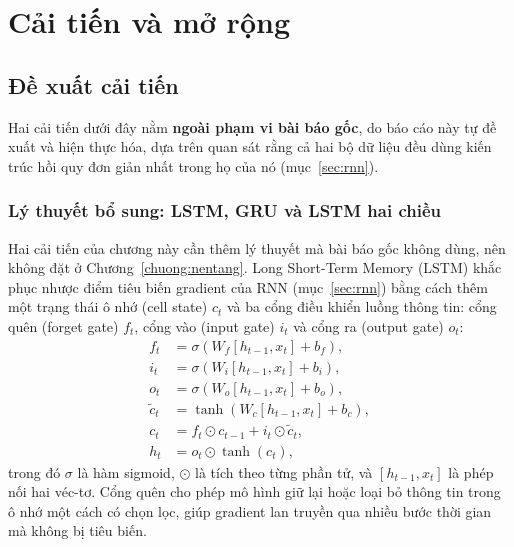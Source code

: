 \chapter{Cải tiến và mở rộng}
\label{chuong:caitien}

\section{Đề xuất cải tiến}

Hai cải tiến dưới đây nằm \textbf{ngoài phạm vi bài báo gốc}, do báo cáo này tự đề xuất và
hiện thực hóa, dựa trên quan sát rằng cả hai bộ dữ liệu đều dùng kiến trúc hồi quy đơn giản
nhất trong họ của nó (mục~\ref{sec:rnn}).

\subsection{Lý thuyết bổ sung: LSTM, GRU và LSTM hai chiều}
\label{sec:lythuyet-caitien}

Hai cải tiến của chương này cần thêm lý thuyết mà bài báo gốc không dùng, nên không đặt ở
Chương~\ref{chuong:nentang}. Long Short-Term Memory (LSTM) \cite{hochreiter1997lstm} khắc phục
nhược điểm tiêu biến gradient của RNN (mục~\ref{sec:rnn}) bằng cách thêm một trạng thái ô nhớ
(cell state) $c_t$ và ba cổng điều khiển luồng thông tin: cổng quên (forget gate) $f_t$, cổng
vào (input gate) $i_t$ và cổng ra (output gate) $o_t$:
\begin{align}
	f_t &= \sigma\!\left(W_f [h_{t-1}, x_t] + b_f\right), \\
	i_t &= \sigma\!\left(W_i [h_{t-1}, x_t] + b_i\right), \\
	o_t &= \sigma\!\left(W_o [h_{t-1}, x_t] + b_o\right), \\
	\tilde{c}_t &= \tanh\!\left(W_c [h_{t-1}, x_t] + b_c\right), \\
	c_t &= f_t \odot c_{t-1} + i_t \odot \tilde{c}_t, \\
	h_t &= o_t \odot \tanh(c_t),
	\label{eq:lstm}
\end{align}
trong đó $\sigma$ là hàm sigmoid, $\odot$ là tích theo từng phần tử, và $[h_{t-1}, x_t]$ là
phép nối hai véc-tơ. Cổng quên cho phép mô hình giữ lại hoặc loại bỏ thông tin trong ô nhớ một
cách có chọn lọc, giúp gradient lan truyền qua nhiều bước thời gian mà không bị tiêu biến.

